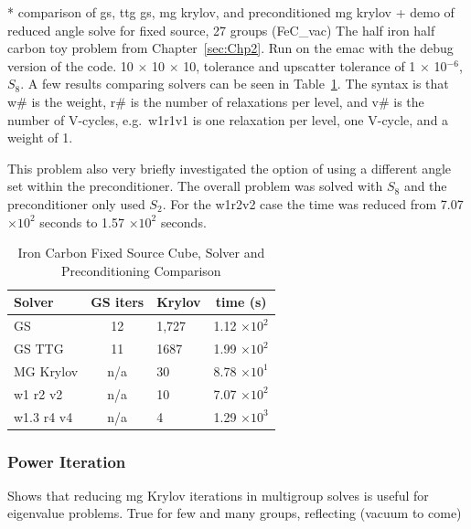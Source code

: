 * comparison of gs, ttg gs, mg krylov, and preconditioned mg krylov + demo of reduced angle solve for fixed source, 27 groups (FeC\_vac)
The half iron half carbon toy problem from Chapter~\ref{sec:Chp2}. Run on the emac with the debug version of the code. 10 $\times$ 10 $\times$ 10, tolerance and upscatter tolerance of 1 $\times$ 10$^{-6}$, $S_{8}$. A few results comparing solvers can be seen in Table~\ref{table:FeC solvers}. The syntax is that w\# is the weight, r\# is the number of relaxations per level, and v\# is the number of V-cycles, e.g.\ w1r1v1 is one relaxation per level, one V-cycle, and a weight of 1.

This problem also very briefly investigated the option of using a different angle set within the preconditioner. The overall problem was solved with $S_{8}$ and the preconditioner only used $S_{2}$. For the w1r2v2 case the time was reduced from 7.07 $\times 10^{2}$ seconds to 1.57 $\times 10^{2}$ seconds. 
%
\begin{table}[!h]
\caption{Iron Carbon Fixed Source Cube, Solver and Preconditioning Comparison}
\begin{center}
\begin{tabular}{l c l c}
\hline
Solver & GS iters & Krylov & time (s)\\[0.5ex]
\hline
GS &  12 & 1,727 & 1.12 $\times 10^{2}$ \\
GS TTG & 11 & 1687 & 1.99 $\times 10^{2}$  \\
MG Krylov & n/a & 30 & 8.78 $\times 10^{1}$ \\
w1 r2 v2 & n/a & 10 & 7.07 $\times 10^{2}$ \\
w1.3 r4 v4 & n/a & 4 & 1.29 $\times 10^{3}$ \\
\hline
\end{tabular}
\end{center}
\label{table:FeC solvers}
\end{table}

\subsubsection{Power Iteration}
Shows that reducing mg Krylov iterations in multigroup solves is useful for eigenvalue problems. True for few and many groups, reflecting (vacuum to come)

